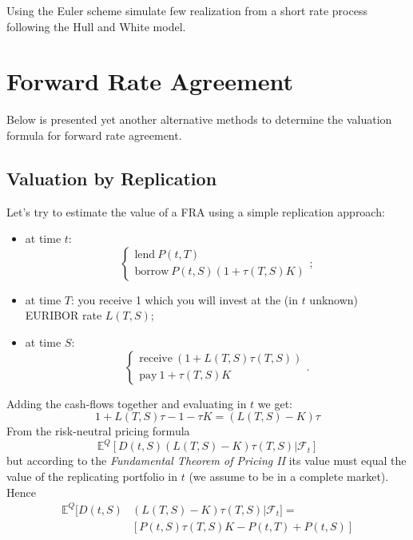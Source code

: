 \documentclass[12pt,a4paper]{article}
\newcommand{\myendproof}{\hfill\qedsymbol}
\begin{document}
\begin{question}
Using the Euler scheme simulate few realization from a short rate process following the Hull and White model.
\end{question}

\clearpage

\section{Forward Rate Agreement}
Below is presented yet another alternative methods to determine the valuation formula for forward rate agreement.

\subsection{Valuation by Replication}
Let's try to estimate the value of a FRA using a simple replication approach:
\begin{itemize}
\item at time $t$: 
	\begin{equation*}
	\begin{cases}
		\text{lend}~P(t,T)\\
		\text{borrow}~P(t,S)(1+\tau(T,S)K)
	\end{cases};
	\end{equation*}
\item at time $T$: you receive 1 which you will invest at the (in $t$ unknown) EURIBOR rate $L(T,S)$;
\item at time $S$: 
	\begin{equation*}
		\begin{cases}
			\text{receive}~(1+L(T,S)\tau(T,S))\\
			\text{pay}~1 + \tau(T,S)K
		\end{cases}.
	\end{equation*}
\end{itemize}

Adding the cash-flows together and evaluating in $t$ we get:
\begin{equation*}
	1+L(T,S)\tau - 1 - \tau K = (L(T,S)-K)\tau
\end{equation*}
From the risk-neutral pricing formula
	\begin{equation*}
		\mathbb{E}^Q[D(t, S)(L(T, S)-K)\tau(T,S)|\mathcal{F}_t]
	\end{equation*}
but according to the \emph{Fundamental Theorem of Pricing II} its value must equal the value of the replicating portfolio in $t$ (we assume to be in a complete market). Hence
\begin{equation}
	\begin{aligned}
		\mathbb{E}^Q[D(t,S)&(L(T,S)-K)\tau(T,S)|\mathcal{F}_t]=\\
			&[P(t,S)\tau(T,S)K-P(t,T)+P(t,S)]
			\label{eq:fra_as_expectation}
	\end{aligned}
\end{equation}
\end{document}
